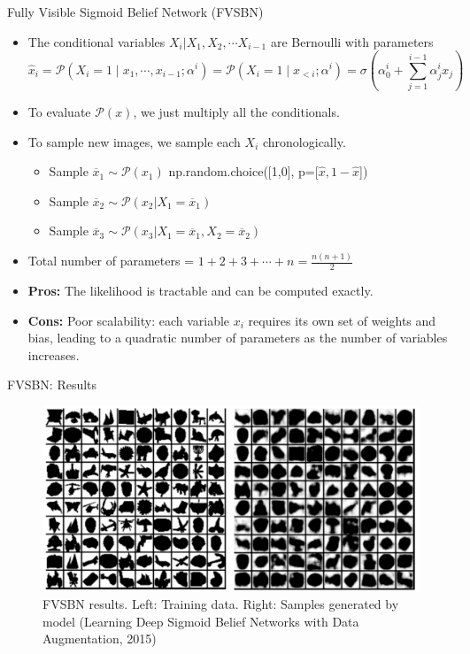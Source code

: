 \begin{frame}[allowframebreaks]{Fully Visible Sigmoid Belief Network (FVSBN)}
\framebreak

\begin{itemize}
    \setlength{\itemsep}{-0.25em}
    \item The conditional variables $X_i | X_1, X_2, \cdots X_{i-1}$ are Bernoulli with parameters
    \vspace{-1em}
    \begin{equation*}
        \hat{x}_i = \mathcal{P}(X_i=1 \mid x_1, \cdots, x_{i-1}; \alpha^i) = \mathcal{P}(X_i=1 \mid x_{<i}; \alpha^i) = \sigma (\alpha_0^i + \sum^{i-1}_{j=1}\alpha_j^i x_j)
    \end{equation*}
    \vspace{-1.5em}
    \item To evaluate $\mathcal{P}(x)$, we just multiply all the conditionals.
    \item To sample new images, we sample each $X_i$ chronologically.
    \begin{itemize}
        \item Sample $\overline{x}_1 \sim \mathcal{P}(x_1)$ np.random.choice([1,0], p=[$\hat{x}, 1-\hat{x}$])
        \item Sample $\overline{x}_2 \sim \mathcal{P}(x_2 | X_1=\overline{x}_1)$
        \item Sample $\overline{x}_3 \sim \mathcal{P}(x_3 | X_1=\overline{x}_1, X_2=\overline{x}_2)$
    \end{itemize}
    \item Total number of parameters = $1+2+3+ \cdots +n = \frac{n(n+1)}{2}$
    \item \textbf{Pros:} The likelihood is tractable and can be computed exactly.
    \item \textbf{Cons:} Poor scalability: each variable $x_i$ requires its own set of weights and bias, leading to a quadratic number of parameters as the number of variables increases.
\end{itemize}
\end{frame}


\begin{frame}{FVSBN: Results}

\begin{figure}
    \centering
    \includegraphics[height=0.7\textheight,keepaspectratio]{images/autoregressive/fvsbn_results.png}
    \caption*{FVSBN results. Left: Training data. Right: Samples generated by model (Learning Deep Sigmoid Belief Networks with Data Augmentation, 2015)}
\end{figure}
    
\end{frame}